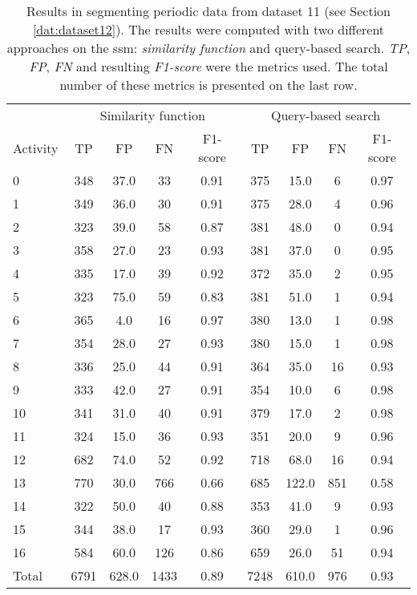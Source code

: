 \begin{table}
\centering
\caption{Results in segmenting periodic data from dataset 11 (see Section \ref{dat:dataset12}). The results were computed with two different approaches on the \gls{ssm}: \textit{similarity function} and query-based search. \textit{TP}, \textit{FP}, \textit{FN }and resulting \textit{F1-score} were the metrics used. The total number of these metrics is presented on the last row.}
\begin{tabular}{lcccccccc}
\toprule
          & \multicolumn{4}{c}{Similarity function} & \multicolumn{4}{c}{Query-based search}\\
Activity &    TP &     FP &    FN &  F1-score &    TP &     FP &   FN &  F1-score \\
\midrule
0  &   348 &   37.0 &    33 &      0.91 &   375 &   15.0 &    6 &      0.97 \\
1  &   349 &   36.0 &    30 &      0.91 &   375 &   28.0 &    4 &      0.96 \\
2  &   323 &   39.0 &    58 &      0.87 &   381 &   48.0 &    0 &      0.94 \\
3  &   358 &   27.0 &    23 &      0.93 &   381 &   37.0 &    0 &      0.95 \\
4  &   335 &   17.0 &    39 &      0.92 &   372 &   35.0 &    2 &      0.95 \\
5  &   323 &   75.0 &    59 &      0.83 &   381 &   51.0 &    1 &      0.94 \\
6  &   365 &    4.0 &    16 &      0.97 &   380 &   13.0 &    1 &      0.98 \\
7  &   354 &   28.0 &    27 &      0.93 &   380 &   15.0 &    1 &      0.98 \\
8  &   336 &   25.0 &    44 &      0.91 &   364 &   35.0 &   16 &      0.93 \\
9  &   333 &   42.0 &    27 &      0.91 &   354 &   10.0 &    6 &      0.98 \\
10 &   341 &   31.0 &    40 &      0.91 &   379 &   17.0 &    2 &      0.98 \\
11 &   324 &   15.0 &    36 &      0.93 &   351 &   20.0 &    9 &      0.96 \\
12 &   682 &   74.0 &    52 &      0.92 &   718 &   68.0 &   16 &      0.94 \\
13 &   770 &   30.0 &   766 &      0.66 &   685 &  122.0 &  851 &      0.58 \\
14 &   322 &   50.0 &    40 &      0.88 &   353 &   41.0 &    9 &      0.93 \\
15 &   344 &   38.0 &    17 &      0.93 &   360 &   29.0 &    1 &      0.96 \\
16 &   584 &   60.0 &   126 &      0.86 &   659 &   26.0 &   51 &      0.94 \\
\midrule
Total &  6791 &  628.0 &  1433 &      0.89 &  7248 &  610.0 &  976 &      0.93\\
\bottomrule
\end{tabular}
\label{tab:periodic_results}
\end{table}


